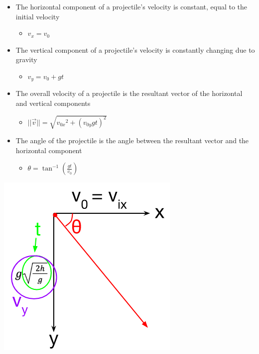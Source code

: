 \documentclass[
  letterpaper,
  DIV=11,
  numbers=noendperiod]{scrartcl}
\providecommand{\tightlist}{%
  \setlength{\itemsep}{0pt}\setlength{\parskip}{0pt}}\usepackage{longtable,booktabs,array}
\begin{document}
\begin{itemize}
\tightlist
\item
  The horizontal component of a projectile's velocity is constant, equal
  to the initial velocity

  \begin{itemize}
  \tightlist
  \item
    \(v_x = v_0\)
  \end{itemize}
\item
  The vertical component of a projectile's velocity is constantly
  changing due to gravity

  \begin{itemize}
  \tightlist
  \item
    \(v_y = v_0 + gt\)
  \end{itemize}
\item
  The overall velocity of a projectile is the resultant vector of the
  horizontal and vertical components

  \begin{itemize}
  \tightlist
  \item
    \(||\vec{v}|| = \sqrt{{v_{0x}}^2 + (v_{0y}gt)^2}\)
  \end{itemize}
\item
  The angle of the projectile is the angle between the resultant vector
  and the horizontal component

  \begin{itemize}
  \tightlist
  \item
    \(\theta = \tan^{-1}\left(\frac{gt}{v_0}\right)\)
  \end{itemize}
\end{itemize}

\includegraphics{img/projectile-vectors.png}
\end{document}
